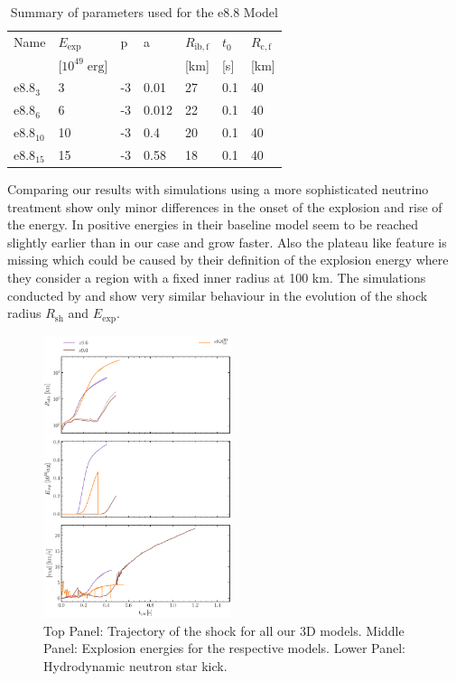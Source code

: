 \documentclass[fleqn,usenatbib]{mnras}
\begin{document}
\begin{table}
   \begin{tabular}{l| l | l | l | l | l | l}
  \label{table:e8param}
  Name &$E_{\mathrm{exp}}$& p & a & $R_{\mathrm{ib,f}}$ & $t_0$ & $R_{\mathrm{c,f}}$\\
                & [$10^{49}\; \mathrm{erg}$] &   &   & [km]  & [s]& [km] \\
  \hline \hline
  $\mathrm{e}8.8_{3}$ &3 	&	 -3 & 0.01 &27 & 0.1 & 40 \\
  $\mathrm{e}8.8_{6}$ & 6 	& 	-3 & 0.012 &22 & 0.1 & 40 \\
  $\mathrm{e}8.8_{10}$ & 10 	& 	-3 & 0.4 & 20 & 0.1 & 40 \\
  $\mathrm{e}8.8_{15}$ & 15 	& 	-3 & 0.58 & 18 & 0.1 & 40 \\
  \end{tabular}
\caption{Summary of parameters used for the e8.8 Model}
\end{table}

Comparing our results with simulations using a more sophisticated neutrino treatment show only minor differences in the onset of the explosion and rise of the energy. In \cite{Radice2017} positive energies in their baseline model seem to be reached slightly earlier than in our case and grow faster. Also the plateau like feature is missing which could be caused by their definition of the explosion energy where they consider a region with a fixed inner radius at 100 km. The simulations conducted by \cite{Groote2014} and \cite{Janka2008} show very similar behaviour in the evolution of the shock radius $R_{\mathrm{sh}}$ and $E_{\mathrm{exp}}$. 

\begin{figure}
 \centering
 \includegraphics[width=0.49\textwidth]{pic/eexp_shk_kick_all_1d2d3d.pdf}
 \caption{Top Panel: Trajectory of the shock for all our 3D models. Middle Panel: Explosion energies for the respective models. Lower Panel: Hydrodynamic neutron star kick.}
\label{fig:eexp_kick_3D} 
\end{figure}
\end{document}
